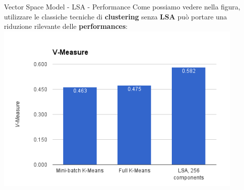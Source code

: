 \documentclass[british]{beamer}
\begin{document}
\begin{frame}{Vector Space Model - LSA - Performance}
	Come possiamo vedere nella figura, utilizzare le classiche tecniche di \textbf{clustering} senza \textbf{LSA} pu\`{o} portare una riduzione rilevante delle \textbf{performances}:
	\includegraphics[width=0.9\textwidth, height=0.7\textheight]{./Imgs/LSAperf}
\end{frame}
\end{document}
